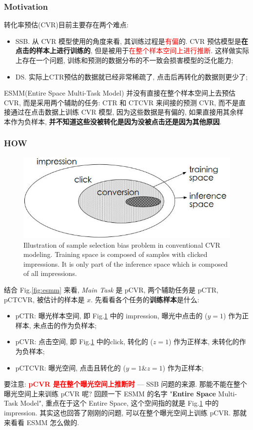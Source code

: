 \subsubsection{Motivation}
转化率预估(CVR)目前主要存在两个难点: 
\begin{itemize}
	\item SSB. 从 CVR 模型使用的角度来看, 其训练过程是\textcolor{red}{有偏}的. CVR 预估模型是\textbf{在点击的样本上进行训练的}, 但是被用于\textcolor{red}{在整个样本空间上进行推断}. 这样做实际上存在一个问题, 训练和预测的数据分布的不一致会损害模型的泛化能力;
	
	\item DS. 实际上CTR预估的数据就已经非常稀疏了, 点击后再转化的数据则更少了;
\end{itemize}

ESMM(Entire Space Multi-Task Model) 并没有直接在整个样本空间上去预估CVR, 而是采用两个辅助的任务: CTR 和 CTCVR 来间接的预测 CVR, 而不是直接通过在点击数据上训练 CVR 模型, 因为这些数据是有偏的, 如果直接用其余样本作为负样本, \textbf{并不知道这些没被转化是因为没被点击还是因为其他原因}.

\subsubsection{HOW}
\begin{figure}[h]
	\centering
	\includegraphics[width=.5\textwidth]{pics/ssb.jpg}
	\caption{Illustration of sample selection bias problem in conventional CVR modeling. Training space is composed of samples with clicked impressions. It is only part of the inference space which is composed of all impressions.}
	\label{fig:ssb}
\end{figure}

结合 Fig.\ref{fig:esmm} 来看, \textit{Main Task} 是 pCVR, 两个辅助任务是 pCTR, pCTCVR, 被估计的样本是 $x$. 先看看各个任务的\textbf{训练样本}是什么:
\begin{itemize}
	\item pCTR: 曝光样本空间, 即 Fig.\ref{fig:ssb} 中的 impression, 曝光中点击的 ($y=1$) 作为正样本, 未点击的作为负样本;
	
	\item pCVR: 点击空间, 即 Fig.\ref{fig:ssb} 中的click, 转化的 ($z=1$) 作为正样本, 未转化的作为负样本;
	
	\item pCTCVR: 曝光空间, 点击且转化的 ($y=1\&z=1$) 作为正样本;
\end{itemize}
要注意: \textbf{\textcolor{red}{pCVR 是在整个曝光空间上推断时}} --- SSB 问题的来源. 那能不能在整个曝光空间上来训练 pCVR 呢? 回顾一下 ESMM 的名字 "\textbf{Entire Space} Multi-Task Model", 重点在于这个 Entire Space, 这个空间指的就是 Fig.\ref{fig:ssb} 中的 impression. 其实这也回答了刚刚的问题, 可以在整个曝光空间上训练 pCVR. 那就来看看 ESMM 怎么做的.

